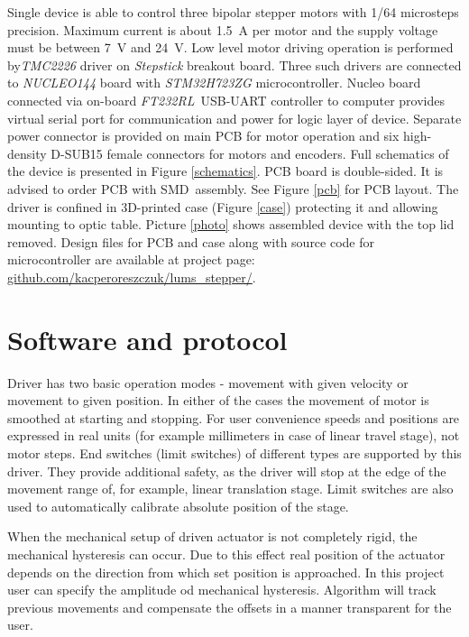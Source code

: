 \documentclass[10pt,article]{article}
\begin{document}
Single device is able to control three bipolar stepper motors with 1/64 microsteps precision. Maximum current is about \SI{1.5}{A} per motor and the supply voltage must be between \SI{7}{V} and \SI{24}{V}.
Low level motor driving operation  is performed by\textit{TMC2226} driver on \textit{Stepstick} breakout board. Three such drivers are connected to \textit{NUCLEO144}  board with \textit{STM32H723ZG} microcontroller. Nucleo board connected via on-board \textit{FT232RL}\ USB-UART controller to computer provides virtual serial port for communication and power for logic layer of device. Separate power connector is provided on main PCB for motor operation and six high-density D-SUB15 female connectors for motors and encoders. Full schematics of the device is presented in Figure \ref{schematics}. PCB board is double-sided. It is advised to order PCB with SMD\ assembly. See Figure \ref{pcb} for PCB layout.  The driver is confined in 3D-printed case (Figure \ref{case}) protecting it and allowing mounting to optic table. Picture \ref{photo} shows assembled device with the top lid removed. Design files for PCB and case along with source code for microcontroller are available at project page: \url{github.com/kacperoreszczuk/lums_stepper/}. 

\newpage
\section{Software and protocol}

Driver has two basic operation modes - movement with given velocity or movement to given position. In either of the cases the movement of motor is smoothed at starting and stopping. For user convenience speeds and positions are expressed in real units (for example millimeters in case of linear travel stage), not motor steps. End switches (limit switches) of different types are supported by this driver. They provide additional safety, as the driver will stop at the edge of the movement range of, for example, linear translation stage. Limit switches are also used to automatically calibrate absolute position of the stage.

When the mechanical setup of driven actuator is not completely rigid, the mechanical hysteresis can occur. Due to this effect real position of the  actuator depends on the direction from which set position is approached. In this project user can specify the amplitude od mechanical hysteresis. Algorithm will track previous movements and compensate the offsets in a manner transparent for the user.  
\end{document}
